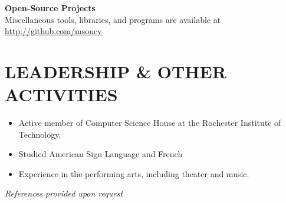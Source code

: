 \documentclass[line]{res}
\newcommand{\project}[2][]{{\bf #2}\hfill #1\\}
\begin{document}
\begin{resume}
	\project                         {Open-Source Projects}
	Miscellaneous tools, libraries, and programs are available at \url{http://github.com/msoucy}

\section{LEADERSHIP \& OTHER ACTIVITIES}
	\begin{itemize}
	\item Active member of Computer Science House at the Rochester Institute of Technology.
	\item Studied American Sign Language and French
	\item Experience in the performing arts, including theater and music.
	\end{itemize}

\begin{center}\vspace{-0.25in}\emph{References provided upon request\\[8pt]}\end{center}

\end{resume}
\end{document}
